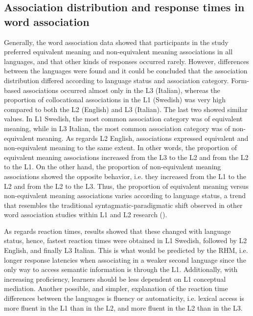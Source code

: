 \documentclass[output=paper,colorlinks,citecolor=brown,nonflat]{langsci/langscibook}
\begin{document}
\subsection{Association distribution and response times in word association}\label{sec:gudmundson:4.1}

Generally, the word association data showed that participants in the study preferred equivalent meaning and non-equivalent meaning associations in all languages, and that other kinds of responses occurred rarely. However, differences between the languages were found and it could be concluded that the association distribution differed according to language status and association category. Form-based associations occurred almost only in the L3 (Italian), whereas the proportion of collocational associations in the L1 (Swedish) was very high compared to both the L2 (English) and L3 (Italian). The last two showed similar values. In L1 Swedish, the most common association category was of equivalent meaning, while in L3 Italian, the most common association category was of non-equivalent meaning. As regards L2 English, associations expressed equivalent and non-equivalent meaning to the same extent. In other words, the proportion of equivalent meaning associations increased from the L3 to the L2 and from the L2 to the L1. On the other hand, the proportion of non-equivalent meaning associations showed the opposite behavior, i.e. they increased from the L1 to the L2 and from the L2 to the L3. Thus, the proportion of equivalent meaning versus non-equivalent meaning associations varies according to language status, a trend that resembles the traditional syntagmatic-paradigmatic shift observed in other word association studies within L1 and L2 research (\citealt{Ervin1961, EntwisleEtAl1964, Meara1978, Politzer1978, FitzpatrickIzura2011, KhazaeenezhadAlibabaee2013}).

As regards reaction times, results showed that these changed with language status, hence, fastest reaction times were obtained in L1 Swedish, followed by L2 English, and finally L3 Italian. This is what would be predicted by the RHM, i.e. longer response latencies when associating in a weaker second language since the only way to access semantic information is through the L1. Additionally, with increasing proficiency, learners should be less dependent on L1 conceptual mediation. Another possible, and simpler, explanation of the reaction time differences between the languages is fluency or automaticity, i.e. lexical access is more fluent in the L1 than in the L2, and more fluent in the L2 than in the L3.
\end{document}
